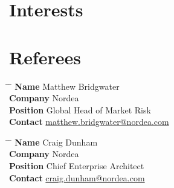 \documentclass[10pt]{article} %
\begin{document}

\section{Interests}



\section{Referees}

\parbox{0.5\textwidth}{ %
\begin{tabbing}
\hspace{2.75cm} \= \hspace{4cm} \= \kill %
{\bf Name} \> Matthew Bridgwater \\ %
{\bf Company} \> Nordea \\ %
{\bf Position} \> Global Head of Market Risk \\ %
{\bf Contact} \> \href{mailto:matthew.bridgwater@nordea.com}{matthew.bridgwater@nordea.com} %
\end{tabbing}}
\hfill %
\parbox{0.5\textwidth}{ %
\begin{tabbing}
\hspace{2.75cm} \= \hspace{4cm} \= \kill %
{\bf Name} \> Craig Dunham\\ %
{\bf Company} \> Nordea \\ %
{\bf Position} \> Chief Enterprise Architect \\ %
{\bf Contact} \> \href{mailto:craig.dunham@nordea.com}{craig.dunham@nordea.com} %
\end{tabbing}}

\end{document}
